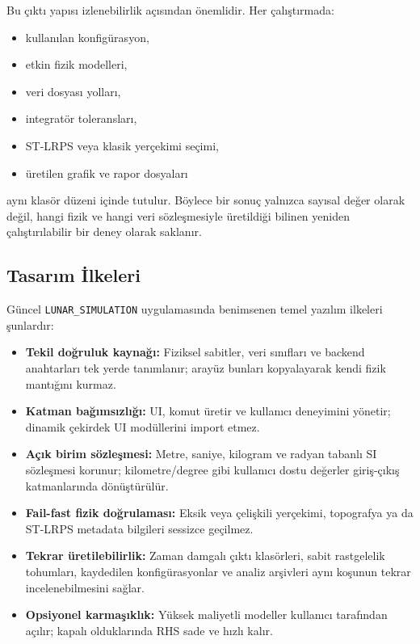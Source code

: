 Bu çıktı yapısı izlenebilirlik açısından önemlidir. Her çalıştırmada:
\begin{itemize}
    \item kullanılan konfigürasyon,
    \item etkin fizik modelleri,
    \item veri dosyası yolları,
    \item integratör toleransları,
    \item ST-LRPS veya klasik yerçekimi seçimi,
    \item üretilen grafik ve rapor dosyaları
\end{itemize}
aynı klasör düzeni içinde tutulur. Böylece bir sonuç yalnızca sayısal değer olarak değil, hangi fizik ve hangi veri sözleşmesiyle üretildiği bilinen yeniden çalıştırılabilir bir deney olarak saklanır.

\subsection{Tasarım İlkeleri}

Güncel \texttt{LUNAR\_SIMULATION} uygulamasında benimsenen temel yazılım ilkeleri şunlardır:
\begin{itemize}
    \item \textbf{Tekil doğruluk kaynağı:} Fiziksel sabitler, veri sınıfları ve backend anahtarları tek yerde tanımlanır; arayüz bunları kopyalayarak kendi fizik mantığını kurmaz.
    \item \textbf{Katman bağımsızlığı:} UI, komut üretir ve kullanıcı deneyimini yönetir; dinamik çekirdek UI modüllerini import etmez.
    \item \textbf{Açık birim sözleşmesi:} Metre, saniye, kilogram ve radyan tabanlı SI sözleşmesi korunur; kilometre/degree gibi kullanıcı dostu değerler giriş-çıkış katmanlarında dönüştürülür.
    \item \textbf{Fail-fast fizik doğrulaması:} Eksik veya çelişkili yerçekimi, topografya ya da ST-LRPS metadata bilgileri sessizce geçilmez.
    \item \textbf{Tekrar üretilebilirlik:} Zaman damgalı çıktı klasörleri, sabit rastgelelik tohumları, kaydedilen konfigürasyonlar ve analiz arşivleri aynı koşunun tekrar incelenebilmesini sağlar.
    \item \textbf{Opsiyonel karmaşıklık:} Yüksek maliyetli modeller kullanıcı tarafından açılır; kapalı olduklarında RHS sade ve hızlı kalır.
\end{itemize}

\newpage
